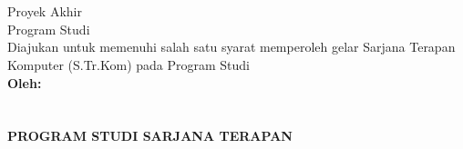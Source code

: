 \begin{titlepage}
    \begin{center}

        \begin{doublespace}
            \textbf{\MakeUppercase{\large{\tipe}}}\\[0.5cm]\textbf{\MakeUppercase{\normalsize{\judulid}}}\\[3cm]

        \end{doublespace}
        Proyek Akhir\\
        Program Studi {\prodi} \\[2cm]
        Diajukan untuk memenuhi salah satu syarat memperoleh gelar Sarjana Terapan
        Komputer (S.Tr.Kom) pada Program Studi {\prodi} {\departemen} {\fakultas} {\universitas}\\[3cm]


        \textbf{\normalsize {Oleh:}} \\
        \textbf{\normalsize \MakeUppercase{\penulis}} \\
        \textbf{\normalsize \MakeUppercase{{\nim}}} \\[4cm]


        \textbf{\normalsize \MakeUppercase{Program Studi Sarjana Terapan\\ \prodi}}\\
        \textbf{\normalsize \MakeUppercase{\departemen}}\\
        \textbf{\normalsize \MakeUppercase{\fakultas}}\\
        \textbf{\normalsize \MakeUppercase{\universitas}}\\
        \textbf{\normalsize \the\year{}}\\
    \end{center}
\end{titlepage}
